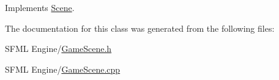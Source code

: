 Implements \hyperlink{class_scene_a72683c984a1da2ce4f757705e93730f2}{Scene}.



The documentation for this class was generated from the following files\+:\begin{DoxyCompactItemize}
\item 
S\+F\+M\+L Engine/\hyperlink{_game_scene_8h}{Game\+Scene.\+h}\item 
S\+F\+M\+L Engine/\hyperlink{_game_scene_8cpp}{Game\+Scene.\+cpp}\end{DoxyCompactItemize}

